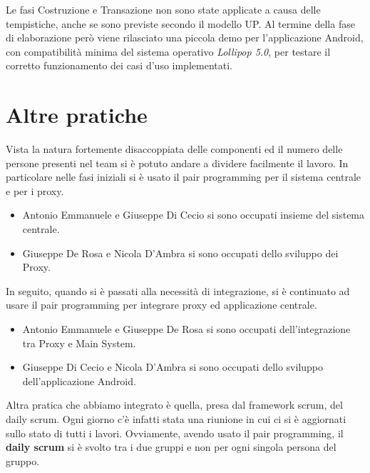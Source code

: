 \vspace{1cm}
Le fasi Costruzione e Transazione non sono state applicate a causa delle tempistiche, anche se sono previste secondo il modello UP. Al termine della fase di elaborazione però viene rilasciato una piccola demo per l'applicazione Android, con compatibilità minima del sistema operativo \textit{Lollipop 5.0}, per testare il corretto funzionamento dei casi d'uso implementati.

\section{Altre pratiche}
Vista la natura fortemente disaccoppiata delle componenti ed il numero delle persone presenti nel team si è potuto andare a dividere facilmente il lavoro.
In particolare nelle fasi iniziali si è usato il pair programming per il sistema centrale e per i proxy.
\begin{itemize}
	\item Antonio Emmanuele e Giuseppe Di Cecio si sono occupati insieme del sistema centrale.
	\item Giuseppe De Rosa e Nicola D’Ambra si sono occupati dello sviluppo dei Proxy.
\end{itemize}
In seguito, quando si è passati alla necessità di integrazione, si è continuato ad usare il pair programming per integrare proxy ed applicazione centrale. 
\begin{itemize}
	\item Antonio Emmanuele e Giuseppe De Rosa si sono occupati dell'integrazione tra Proxy e Main System.
	\item Giuseppe Di Cecio e Nicola D’Ambra si sono occupati dello sviluppo dell'applicazione Android.
\end{itemize}
Altra pratica che abbiamo integrato è quella, presa dal framework scrum, del daily scrum.
Ogni giorno c’è infatti stata una riunione in cui ci si è aggiornati sullo stato di tutti i lavori.
Ovviamente, avendo usato il pair programming, il \textbf{daily scrum} si è svolto tra i due gruppi e non per ogni singola persona del gruppo.
